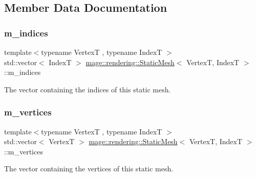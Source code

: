 \subsection{Member Data Documentation}
\hypertarget{classmage_1_1rendering_1_1_static_mesh_a917240e2f91db85a7f03e8cca766fb26}{}\label{classmage_1_1rendering_1_1_static_mesh_a917240e2f91db85a7f03e8cca766fb26} 
\subsubsection{\texorpdfstring{m\+\_\+indices}{m\_indices}}
{\footnotesize\ttfamily template$<$typename VertexT , typename IndexT $>$ \\
std\+::vector$<$ IndexT $>$ \hyperlink{classmage_1_1rendering_1_1_static_mesh}{mage\+::rendering\+::\+Static\+Mesh}$<$ VertexT, IndexT $>$\+::m\+\_\+indices\hspace{0.3cm}{\ttfamily [private]}}

The vector containing the indices of this static mesh. \hypertarget{classmage_1_1rendering_1_1_static_mesh_ae34755a64d965a9e8c5d32c0c2371424}{}\label{classmage_1_1rendering_1_1_static_mesh_ae34755a64d965a9e8c5d32c0c2371424} 
\subsubsection{\texorpdfstring{m\+\_\+vertices}{m\_vertices}}
{\footnotesize\ttfamily template$<$typename VertexT , typename IndexT $>$ \\
std\+::vector$<$ VertexT $>$ \hyperlink{classmage_1_1rendering_1_1_static_mesh}{mage\+::rendering\+::\+Static\+Mesh}$<$ VertexT, IndexT $>$\+::m\+\_\+vertices\hspace{0.3cm}{\ttfamily [private]}}

The vector containing the vertices of this static mesh. 